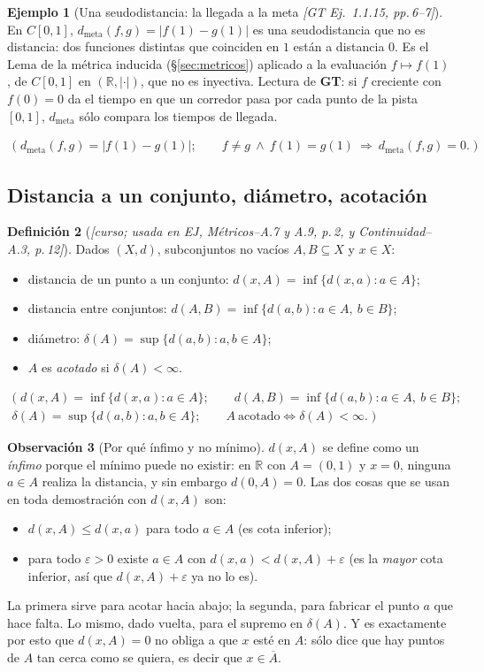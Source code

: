 \documentclass[11pt,a4paper]{article}
\newenvironment{lista}{\leavevmode\begin{itemize}[leftmargin=1.5em,itemsep=1pt,topsep=2pt,parsep=0pt]}{\end{itemize}}
\newcommand{\lgc}[1]{\par\vspace{-3pt}\begin{gather*}\big(\;#1\;\big)\end{gather*}\vspace{-6pt}}
\theoremstyle{definition}
\newtheorem{definicion}{Definición}[section]
\newtheorem{ejemplo}[definicion]{Ejemplo}
\newtheorem{observacion}[definicion]{Observación}
\theoremstyle{plain}
\newcommand{\fnt}[1]{{\normalfont\small\itshape\color{gray!150!black}[#1]}}
\newcommand{\R}{\mathbb{R}}
\newcommand{\cl}[1]{\overline{#1}}
\begin{document}
\begin{ejemplo}[Una seudodistancia: la llegada a la meta \fnt{GT Ej.\ 1.1.15, pp.\,6--7}]\label{hu:dmeta}
En $C[0,1]$, $d_{\text{meta}}(f,g)=|f(1)-g(1)|$ es una seudodistancia que no es distancia: dos funciones distintas que coinciden en $1$ están a distancia $0$. Es el Lema de la métrica inducida (\S\ref{sec:metricos}) aplicado a la evaluación $f\mapsto f(1)$, de $C[0,1]$ en $(\R,|\cdot|)$, que no es inyectiva. Lectura de \textbf{GT}: si $f$ creciente con $f(0)=0$ da el tiempo en que un corredor pasa por cada punto de la pista $[0,1]$, $d_{\text{meta}}$ sólo compara los tiempos de llegada.
\lgc{d_{\text{meta}}(f,g)=|f(1)-g(1)|;\qquad f\ne g\ \wedge\ f(1)=g(1)\ \Rightarrow\ d_{\text{meta}}(f,g)=0.}
\end{ejemplo}

\subsection{Distancia a un conjunto, diámetro, acotación}

\begin{definicion}[\fnt{curso; usada en EJ, Métricos--A.7 y A.9, p.\,2, y Continuidad--A.3, p.\,12}]
Dados $(X,d)$, subconjuntos no vacíos $A,B\subseteq X$ y $x\in X$:
\begin{lista}
\item distancia de un punto a un conjunto: $d(x,A)=\inf\{d(x,a):a\in A\}$;
\item distancia entre conjuntos: $d(A,B)=\inf\{d(a,b):a\in A,\ b\in B\}$;
\item diámetro: $\delta(A)=\sup\{d(a,b):a,b\in A\}$;
\item $A$ es \emph{acotado} si $\delta(A)<\infty$.
\end{lista}
\lgc{d(x,A)=\inf\{d(x,a):a\in A\};\qquad d(A,B)=\inf\{d(a,b):a\in A,\ b\in B\};\\
\delta(A)=\sup\{d(a,b):a,b\in A\};\qquad A\ \text{acotado}\iff \delta(A)<\infty.}
\end{definicion}

\begin{observacion}[Por qué ínfimo y no mínimo]
$d(x,A)$ se define como un \emph{ínfimo} porque el mínimo puede no existir: en $\R$ con $A=(0,1)$ y $x=0$, ninguna $a\in A$ realiza la distancia, y sin embargo $d(0,A)=0$. Las dos cosas que se usan en toda demostración con $d(x,A)$ son:
\begin{lista}
\item $d(x,A)\le d(x,a)$ para todo $a\in A$ (es cota inferior);
\item para todo $\varepsilon>0$ existe $a\in A$ con $d(x,a)<d(x,A)+\varepsilon$ (es la \emph{mayor} cota inferior, así que $d(x,A)+\varepsilon$ ya no lo es).
\end{lista}
La primera sirve para acotar hacia abajo; la segunda, para fabricar el punto $a$ que hace falta. Lo mismo, dado vuelta, para el supremo en $\delta(A)$. Y es exactamente por esto que $d(x,A)=0$ no obliga a que $x$ esté en $A$: sólo dice que hay puntos de $A$ tan cerca como se quiera, es decir que $x\in\cl A$.
\end{observacion}
\end{document}
